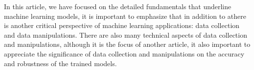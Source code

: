
\par
In this article, we have focused on the detailed fundamentals that underline machine learning models, it is important to emphasize that in addition to athere is another critical perspective of machine learning applications: data collection and data manipulations. There are also many technical aspects of data collection and manipulations, although it is the focus of another article, it also important to appreciate the significance of data collection and manipulations on the accuracy and robustness of the trained models.
\par 
